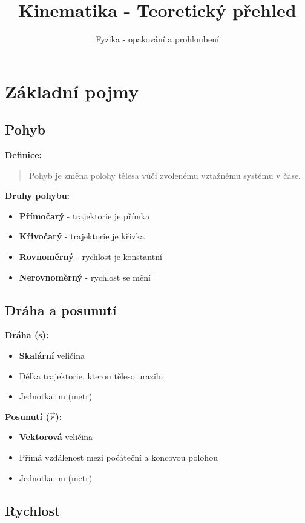 \documentclass[11pt,a4paper]{article}
\title{Kinematika - Teoretický přehled}
\author{Fyzika - opakování a prohloubení}
\date{}
\begin{document}
\maketitle

\section{Základní pojmy}

\subsection{Pohyb}

\textbf{Definice:}
\begin{quote}
Pohyb je změna polohy tělesa vůči zvolenému vztažnému systému v čase.
\end{quote}

\textbf{Druhy pohybu:}
\begin{itemize}
\item \textbf{Přímočarý} - trajektorie je přímka
\item \textbf{Křivočarý} - trajektorie je křivka
\item \textbf{Rovnoměrný} - rychlost je konstantní
\item \textbf{Nerovnoměrný} - rychlost se mění
\end{itemize}

\subsection{Dráha a posunutí}

\textbf{Dráha (s):}
\begin{itemize}
\item \textbf{Skalární} veličina
\item Délka trajektorie, kterou těleso urazilo
\item Jednotka: m (metr)
\end{itemize}

\textbf{Posunutí ($\vec{r}$):}
\begin{itemize}
\item \textbf{Vektorová} veličina
\item Přímá vzdálenost mezi počáteční a koncovou polohou
\item Jednotka: m (metr)
\end{itemize}

\subsection{Rychlost}
\end{document}
